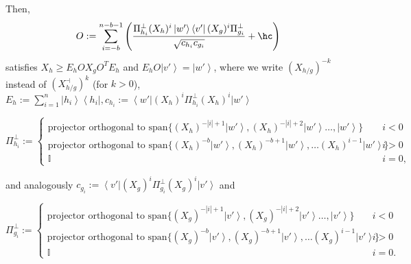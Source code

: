 \documentclass{theoretics}
\begin{document}
\begin{proposition}
\begin{itemize}
  \end{itemize}
  Then,
  \begin{displaymath}
    O:=\sum_{i=-b}^{n-b-1}\left(\frac{\Pi_{h_{i}}^{\perp}(X_{h})^{i}\left|w'\right\rangle \left\langle v'\right|(X_{g})^{i}\Pi_{g_{i}}^{\perp}}{\sqrt{c_{h_{i}}c_{g_{i}}}}+\hc\right)
  \end{displaymath}
  satisfies
  $X_{h}\ge E_{h}OX_{g}O^{T}E_{h}$ and $E_{h}O\left|v'\right\rangle =\left|w'\right\rangle$,
  where we write $(X_{h/g})^{-k}$ instead of $(X_{h/g}^{\dashv})^{k}$
  (for $k>0$),
  $
    E_{h}:=\sum_{i=1}^{n}\left|h_{i}\right\rangle \left\langle h_{i}\right|, c_{h_{i}}:=\left\langle w'\right|(X_{h})^{i}\Pi_{h_{i}}^{\perp}(X_{h})^{i}\left|w'\right\rangle
  $
  \begin{small}
    \begin{displaymath}
      \Pi_{h_{i}}^{\perp}:=\begin{cases}
        \text{projector orthogonal to }\text{span}\{(X_{h})^{-|i|+1}\left|w'\right\rangle ,(X_{h})^{-|i|+2}\left|w'\right\rangle \dots,\left|w'\right\rangle \}        & i<0  \\
        \text{projector orthogonal to }\text{span}\{(X_{h})^{-b}\left|w'\right\rangle ,(X_{h})^{-b+1}\left|w'\right\rangle ,\dots(X_{h})^{i-1}\left|w'\right\rangle \} & i>0  \\
        \mathbb{I}                                                                                                                                                     & i=0,
      \end{cases}
    \end{displaymath}
  \end{small}
  and analogously $c_{g_{i}}:=\left\langle v'\right|(X_{g})^{i}\Pi_{g_{i}}^{\perp}(X_{g})^{i}\left|v'\right\rangle $ and
  \begin{small}
    \begin{displaymath}
      \Pi_{g_{i}}^{\perp}:=\begin{cases}
        \text{projector orthogonal to }\text{span}\{(X_{g})^{-|i|+1}\left|v'\right\rangle ,(X_{g})^{-|i|+2}\left|v'\right\rangle \dots,\left|v'\right\rangle \}        & i<0  \\
        \text{projector orthogonal to }\text{span}\{(X_{g})^{-b}\left|v'\right\rangle ,(X_{g})^{-b+1}\left|v'\right\rangle ,\dots(X_{g})^{i-1}\left|v'\right\rangle \} & i>0  \\
        \mathbb{I}                                                                                                                                                     & i=0.
      \end{cases}
    \end{displaymath}
  \end{small}


\end{proposition}
\end{document}
